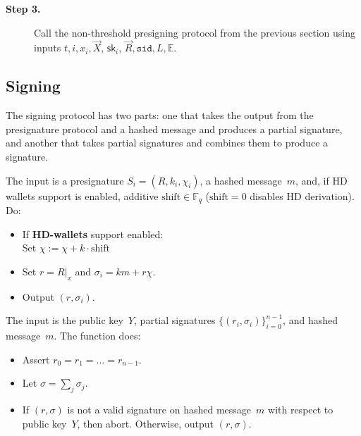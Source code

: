 \documentclass[11pt]{article}
\newcommand{\sid}{\ensuremath{\mathtt{sid}}}
\newcommand{\affineX}[1]{#1|_{\textit{x}}}
\newcommand{\sk}{\textsf{sk}}
\newcommand{\Fq}{\mathbb{F}_q}
\newcommand{\E}{\mathbb{E}}
\newcommand{\?}[1]{\stackrel{?}{#1}}
\begin{document}
\begin{description}
    \item[\bf Step 3.] Call the non-threshold presigning protocol from the previous section using inputs $t, i, x_i, \vec X$, $\sk_i$, $\vec R, \sid, L, \E$.
\end{description}


\subsection{Signing}
\label{sec:signing}
The signing protocol has two parts: one that takes the output from the presignature protocol and a hashed message and produces a partial signature, and another that takes partial signatures and combines them to produce a signature. 
    
\medskip{} The input is a presignature 
  $S_i = (R, k_i, \chi_i)$,
  a hashed message~$m$,
  and, if HD wallets support is enabled, additive $\text{shift} \in \Fq$  ($\text{shift} = 0$ disables HD derivation).
  Do:
        \begin{itemize}
            \item If {\bf HD-wallets} support enabled: \\
              Set $\chi := \chi + k \cdot \text{shift}$
            \item Set $r = \affineX{R}$ and $\sigma_i = k m + r \chi$.
            \item Output $(r, \sigma_i)$.
        \end{itemize}
        

    \medskip{} The input is the public key~$Y$, partial signatures $\{(r_i, \sigma_i)\}_{i=0}^{n-1}$, and hashed message~$m$.
The function does:
        \begin{itemize}
            \item Assert $r_0 = r_1 = \dots = r_{n-1}$.
            \item Let $\sigma = \sum_j \sigma_j$.
            \item If $(r, \sigma)$ is not a valid signature on hashed message~$m$ with respect to public key~$Y$, then abort. Otherwise, 
            output $(r, \sigma)$.
        \end{itemize}
\end{document}
